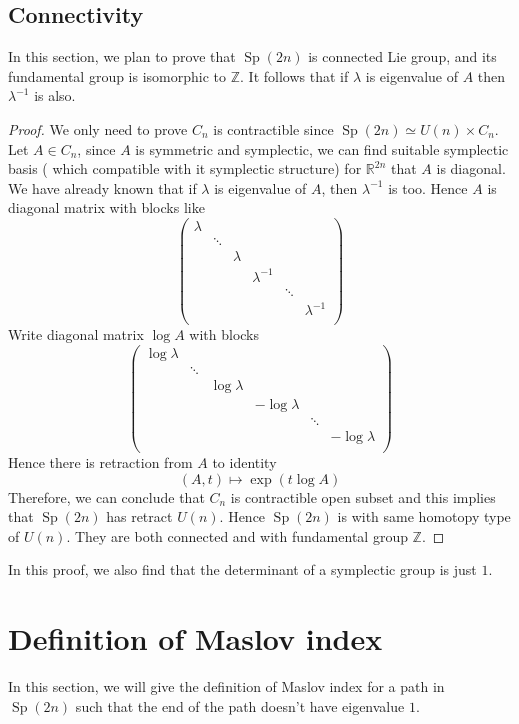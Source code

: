 \documentclass[a4paper,11pt]{amsart}
\DeclareMathOperator{\Sp}{Sp}
\theoremstyle{plain}
\theoremstyle{theorem}
\theoremstyle{definition}
\begin{document}
\subsection{Connectivity}
In this section, we plan to prove that $\Sp(2n)$ is connected Lie group, and its fundamental group is isomorphic to $\mathbb{Z}$. It follows that if $\lambda$ is eigenvalue of $A$ then $\lambda^{-1}$ is also. 
\begin{proof}
	We only need to prove $C_n$ is contractible since $\Sp(2n) \simeq U(n) \times C_n$. Let $A \in C_n$, since $A$ is symmetric and symplectic, we can find suitable symplectic basis ( which compatible with it symplectic structure) for $\mathbb{R}^{2n}$ that $A$ is diagonal. We have already known that if $\lambda$ is eigenvalue of $A$, then $\lambda^{-1}$ is too. Hence $A$ is diagonal matrix with blocks like
	\[
	\begin{pmatrix}
	\lambda& & & & & \\
	& \ddots& & & & \\
	& & \lambda & & &   \\
	& & & \lambda^{-1} & & \\
	& & & & \ddots & \\
	& & & & & \lambda^{-1}\\
	\end{pmatrix}
	\]
	Write diagonal matrix $\log A$ with blocks
	\[
	\begin{pmatrix}
	\log\lambda& & & & & \\
	& \ddots& & & & \\
	& & \log\lambda & & &   \\
	& & & -\log\lambda & & \\
	& & & & \ddots & \\
	& & & & & -\log\lambda\\
	\end{pmatrix}
	\]
	Hence there is retraction from $A$ to identity
	\[
	(A,t) \mapsto \exp (t \log A)
	\]
	Therefore, we can conclude that $C_n$ is contractible open subset and this implies that $\Sp(2n)$ has retract $U(n)$. Hence $\Sp(2n)$ is with same homotopy type of $U(n)$. They are both connected and with fundamental group $\mathbb{Z}$.
\end{proof}
In this proof, we also find that the determinant of a symplectic group is just $1$.
\section{Definition of Maslov index}
In this section, we will give the definition of Maslov index for a path in $\Sp(2n)$ such that the end of the path doesn't have eigenvalue $1$.
\end{document}
